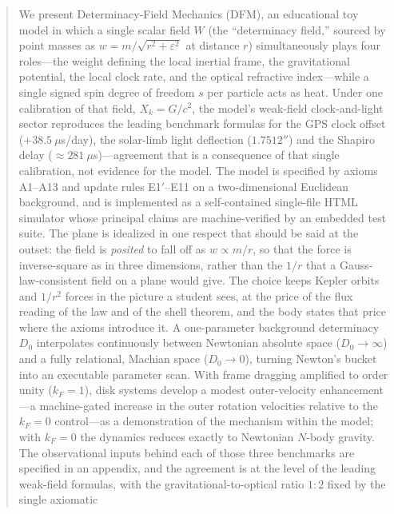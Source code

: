 \documentclass[aps,reprint,amsmath,amssymb,nofootinbib,superscriptaddress,floatfix]{revtex4-2}
\newcommand{\Kt}{X_k}
\newcommand{\Dz}{D_0}
\begin{document}
\begin{abstract}
We present Determinacy-Field Mechanics (DFM), an educational toy model in
which a single scalar field $W$ (the ``determinacy field,'' sourced by
point masses as $w = m/\sqrt{r^2+\varepsilon^2}$ at distance $r$) simultaneously plays
four roles---the weight defining the local inertial frame, the
gravitational potential, the local clock rate, and the optical
refractive index---while a single signed spin degree of freedom $s$ per
particle acts as heat.
Under one calibration of that field, $\Kt = G/c^2$, the model's
weak-field clock-and-light sector reproduces the leading benchmark
formulas for the GPS clock offset ($+38.5\ \mu$s/day), the solar-limb
light deflection ($1.7512''$) and the Shapiro delay
($\approx 281\ \mu$s)---agreement that is a consequence of that single
calibration, not evidence for the model.
The model is specified by axioms A1--A13 and update rules E1$'$--E11 on a
two-dimensional Euclidean background, and is implemented as a
self-contained single-file HTML simulator whose principal claims are
machine-verified by an embedded test suite.
The plane is idealized in one respect that should be said at the
outset: the field is \emph{posited} to fall off as $w \propto m/r$, so
that the force is inverse-square as in three dimensions, rather than
the $1/r$ that a Gauss-law-consistent field on a plane would give.
The choice keeps Kepler orbits and $1/r^2$ forces in the picture a
student sees, at the price of the flux reading of the law and of the
shell theorem, and the body states that price where the axioms
introduce it.
A one-parameter background determinacy $\Dz$ interpolates continuously
between Newtonian absolute space ($\Dz \to \infty$) and a fully
relational, Machian space ($\Dz \to 0$), turning Newton's bucket into
an executable parameter scan.
With frame dragging amplified to order unity ($k_F = 1$), disk systems
develop a modest outer-velocity enhancement---a machine-gated increase
in the outer rotation velocities relative to the $k_F = 0$ control---as
a demonstration of the mechanism within the model; with $k_F = 0$ the
dynamics reduces exactly to Newtonian $N$-body gravity.
The observational inputs behind each of those three benchmarks are
specified in an appendix, and the agreement is at the level of the
leading weak-field formulas, with the
gravitational-to-optical ratio $1{:}2$ fixed by the single axiomatic

\end{abstract}
\end{document}
